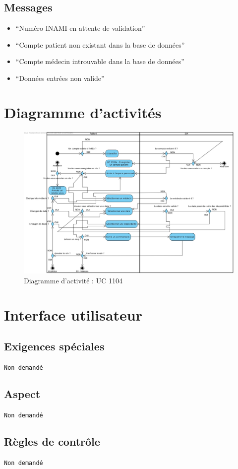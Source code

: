 \documentclass[a4paper, 11pt]{report}
\begin{document}
\subsection{Messages}
\begin{itemize}
	\item ``Numéro INAMI en attente de validation''
	\item ``Compte patient non existant dans la base de données''
	\item ``Compte médecin introuvable dans la base de données''
	\item ``Données entrées non valide''
\end{itemize}
\newpage

\section{Diagramme d'activités}
\begin{figure}[hb]
	\centering
	\includegraphics[scale=0.4]{activiteUC1104.jpg}
	\caption{Diagramme d'activité : UC 1104}
	\label{fig:act1104}
\end{figure}
\newpage

\section{Interface utilisateur}
\subsection{Exigences spéciales}
\texttt{Non demandé}
\subsection{Aspect}
\texttt{Non demandé}
\subsection{Règles de contrôle}
\texttt{Non demandé}
\newpage
\end{document}
